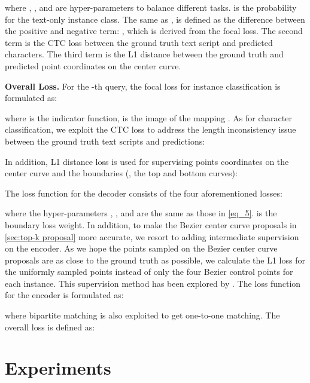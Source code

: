 \documentclass[10pt,twocolumn,letterpaper]{article}
\begin{document}
where , , and  are hyper-parameters to balance different tasks.  is the probability for the text-only instance class. The same as \cite{zhang2022text},  is defined as the difference between the positive and negative term: , which is derived from the focal loss\cite{lin2017focal}. The second term is the CTC loss between the ground truth text script and predicted  characters. The third term is the L1 distance between the ground truth and predicted point coordinates on the center curve.

\noindent \textbf{Overall Loss.} For the -th query, the focal loss for instance classification is formulated as:

where  is the indicator function,  is the image of the mapping . As for character classification, we exploit the CTC loss to address the length inconsistency issue between the ground truth text scripts and predictions:

In addition, L1 distance loss is used for supervising points coordinates on the center curve and the boundaries (\ie, the top and bottom curves):



The loss function for the decoder consists of the four aforementioned losses:

where the hyper-parameters , , and  are the same as those in \cref{eq_5}.  is the boundary loss weight. In addition, to make the Bezier center curve proposals in \cref{sec:top-k proposal} more accurate, we resort to adding intermediate supervision on the encoder. As we hope the points sampled on the Bezier center curve proposals are as close to the ground truth as possible, we calculate the L1 loss for the  uniformly sampled points instead of only the four Bezier control points for each instance. This supervision method has been explored by \cite{feng2022rethinking}. The loss function for the encoder is formulated as:

where bipartite matching is also exploited to get one-to-one matching. The overall loss  is defined as:



\section{Experiments}
\end{document}
